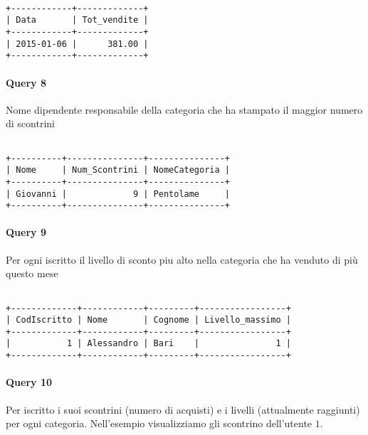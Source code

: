 \begin{verbatim}

+------------+-------------+
| Data       | Tot_vendite |
+------------+-------------+
| 2015-01-06 |      381.00 |
+------------+-------------+

\end{verbatim}



\paragraph*{Query 8}
Nome dipendente responsabile della categoria che ha stampato il maggior numero di scontrini

\begin{verbatim}

+----------+---------------+---------------+
| Nome     | Num_Scontrini | NomeCategoria |
+----------+---------------+---------------+
| Giovanni |             9 | Pentolame     |
+----------+---------------+---------------+

\end{verbatim}



\paragraph*{Query 9}
Per ogni iscritto il livello di sconto piu alto nella categoria che ha venduto di pi\`u questo mese

\begin{verbatim}

+-------------+------------+---------+-----------------+
| CodIscritto | Nome       | Cognome | Livello_massimo |
+-------------+------------+---------+-----------------+
|           1 | Alessandro | Bari    |               1 |
+-------------+------------+---------+-----------------+

\end{verbatim}



\paragraph*{Query 10}
Per iscritto i suoi scontrini (numero di acquisti) e i livelli (attualmente raggiunti) per ogni categoria.
Nell'esempio visualizziamo gli scontrino dell'utente $1$.

